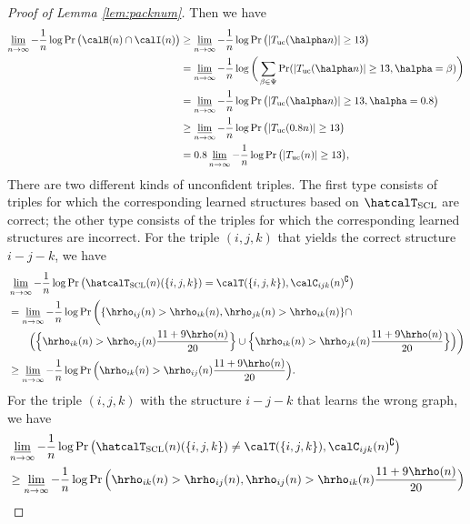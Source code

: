 \documentclass[11pt,onecolumn]{article}
\begin{document}
\begin{proof}[Proof of Lemma \ref{lem:packnum}]
	Then we have
	\begin{align}
		\varliminf_{n\rightarrow\infty}-\frac{1}{n}\log\Pr\big(\calH(n)\cap \calI(n)\big)&\geq \varliminf_{n\rightarrow\infty}-\frac{1}{n}\log\Pr\big(|T_{{\rm uc}}(\halpha n)|\geq 13\big)\\
		&=\varliminf_{n\rightarrow\infty}-\frac{1}{n}\log\bigg(\sum_{\beta\in\Psi}\Pr(|T_{{\rm uc}}(\halpha n)|\geq 13,\halpha=\beta)\bigg)\\
		&=\varliminf_{n\rightarrow\infty}-\frac{1}{n}\log\Pr\big(|T_{{\rm uc}}(\halpha n)|\geq 13,\halpha=0.8\big)\\
		&\geq \varliminf_{n\rightarrow\infty}-\frac{1}{n}\log\Pr \big(|T_{{\rm uc}}(0.8 n)|\geq 13\big)\\
		&=0.8 \varliminf_{n\rightarrow\infty}-\frac{1}{n}\log\Pr\big(|T_{{\rm uc}}(n)|\geq 13\big),
	\end{align}
	There are two different kinds of unconfident triples. The first type consists of  triples for which the corresponding learned structures based on $\hatcalT_{{\rm SCL}}$ are correct; the other type consists of the triples for which the corresponding learned structures are incorrect. For the triple $(i,j,k)$ that yields the correct    structure $i-j-k$, we have
	\begin{align}
		&\varliminf_{n\rightarrow\infty}-\frac{1}{n}\log\Pr\big(\hatcalT_{{\rm SCL}}(n)(\{i,j,k\})=\calT(\{i,j,k\}),\calC_{ijk}(n)^{\complement}\big)\nonumber\\
		&=\varliminf_{n\rightarrow\infty}-\frac{1}{n}\log\Pr\bigg(\{\hrho_{ij}( n)>\hrho_{ik}( n),\hrho_{jk}( n)>\hrho_{ik}( n)\}\cap \nonumber\\*
		& \qquad\Big(\Big\{\hrho_{ik}( n)>\hrho_{ij}( n)\frac{11+9\hrho( n)}{20}\Big\}\cup\Big\{\hrho_{ik}( n)>\hrho_{jk}( n)\frac{11+9\hrho( n)}{20}\Big\}\Big)\bigg)\\
		&\geq \varliminf_{n\rightarrow\infty}-\frac{1}{n}\log\Pr\Big(\hrho_{ik}( n)>\hrho_{ij}( n)\frac{11+9\hrho( n)}{20}\Big).
	\end{align}
	For the triple $(i,j,k)$ with the  structure $i-j-k$ that learns the wrong graph, we have
	\begin{align}
		&\varliminf_{n\rightarrow\infty}-\frac{1}{n}\log\Pr\big(\hatcalT_{{\rm SCL}}(n)(\{i,j,k\})\neq \calT(\{i,j,k\}),\calC_{ijk}(n)^{\complement}\big)\nonumber\\
		&\geq\varliminf_{n\rightarrow\infty}-\frac{1}{n}\log\Pr\Big(\hrho_{ik}( n)>\hrho_{ij}( n),\hrho_{ij}( n)>\hrho_{ik}( n)\frac{11+9\hrho( n)}{20}\Big)\\

\end{align}
\end{proof}
\end{document}
